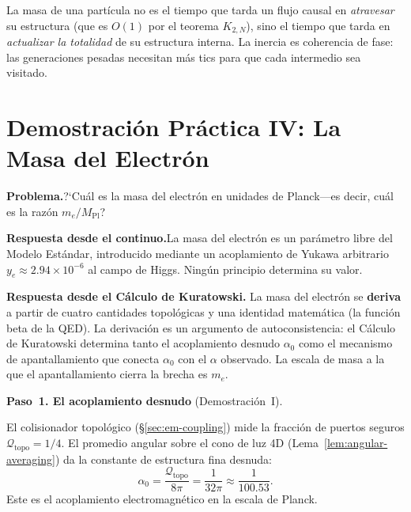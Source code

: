 \documentclass[11pt, a4paper, openany]{book}
\begin{document}
\begin{result}[title={Masa din\'amica $=$ inercia topol\'ogica}]
La masa de una part\'icula no es el tiempo que tarda un flujo causal
en \emph{atravesar} su estructura (que es $O(1)$ por el teorema
$K_{2,N}$), sino el tiempo que tarda en \emph{actualizar la totalidad}
de su estructura interna. La inercia es coherencia de fase: las
generaciones pesadas necesitan m\'as tics para que cada intermedio sea
visitado.
\end{result}

\bigskip

\section*{Demostraci\'on Pr\'actica IV: La Masa del Electr\'on}
\label{sec:demo-electron}

\noindent\textbf{Problema.}\enspace ?`Cu\'al es la masa del electr\'on
en unidades de Planck---es decir, cu\'al es la raz\'on
$m_e / M_{\mathrm{Pl}}$?

\noindent\textbf{Respuesta desde el continuo.}\enspace La masa del
electr\'on es un par\'ametro libre del Modelo Est\'andar, introducido
mediante un acoplamiento de Yukawa arbitrario
$y_e \approx 2.94 \times 10^{-6}$ al campo de Higgs. Ning\'un
principio determina su valor.

\noindent\textbf{Respuesta desde el C\'alculo de Kuratowski.}\enspace
La masa del electr\'on se \textbf{deriva} a partir de cuatro cantidades
topol\'ogicas y una identidad matem\'atica (la funci\'on beta de la
QED). La derivaci\'on es un argumento de autoconsistencia: el C\'alculo
de Kuratowski determina tanto el acoplamiento desnudo $\alpha_0$ como el
mecanismo de apantallamiento que conecta $\alpha_0$ con el $\alpha$
observado. La escala de masa a la que el apantallamiento cierra la
brecha es $m_e$.

\bigskip
\noindent
\textbf{Paso~1. El acoplamiento desnudo} (Demostraci\'on~I).

\medskip\noindent
El colisionador topol\'ogico (\S\ref{sec:em-coupling}) mide la
fracci\'on de puertos seguros $\mathcal{Q}_{\mathrm{topo}} = 1/4$.
El promedio angular sobre el cono de luz 4D
(Lema~\ref{lem:angular-averaging}) da la constante de estructura fina
desnuda:
\begin{equation}
  \alpha_0 = \frac{\mathcal{Q}_{\mathrm{topo}}}{8\pi}
  = \frac{1}{32\pi}
  \approx \frac{1}{100.53}.
  \tag{$M$-V.1}
  \label{eq:alpha0-recap}
\end{equation}
Este es el acoplamiento electromagn\'etico en la escala de Planck.
\end{document}

